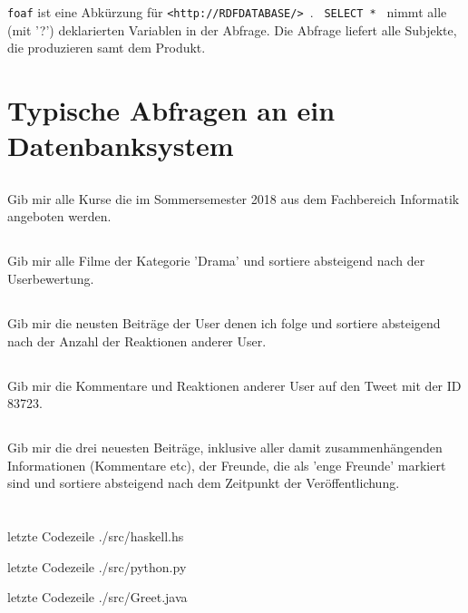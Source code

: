 \texttt{foaf} ist eine Abkürzung für \texttt{<http://RDFDATABASE/>
}. \texttt{ SELECT * } nimmt alle (mit '?') deklarierten Variablen in der Abfrage. Die Abfrage liefert alle Subjekte, die produzieren samt dem Produkt.


\section{Typische Abfragen an ein Datenbanksystem}
\subsection{}
Gib mir alle Kurse die im Sommersemester 2018 aus dem Fachbereich Informatik angeboten werden.

\subsection{}
Gib mir alle Filme der Kategorie 'Drama' und sortiere absteigend nach der Userbewertung.

\subsection{}
Gib mir die neusten Beiträge der User denen ich folge und sortiere absteigend nach der Anzahl der Reaktionen anderer User.

\subsection{}
Gib mir die Kommentare und Reaktionen anderer User auf den Tweet mit der ID 83723.

\subsection{}
Gib mir die drei neuesten Beiträge, inklusive aller damit zusammenhängenden Informationen (Kommentare etc), der Freunde, die als 'enge Freunde' markiert sind und sortiere absteigend nach dem Zeitpunkt der Veröffentlichung.

\section{}

 letzte Codezeile
{./src/haskell.hs}


 letzte Codezeile
{./src/python.py}


 letzte Codezeile
{./src/Greet.java}

\printbibliography %


